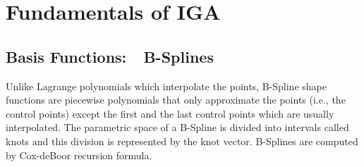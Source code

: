 \documentclass[12pt, a4paper]{report}
\begin{document}
\chapter{Fundamentals of IGA} \label{chap: IGA_Fundamentals}
\section{Basis Functions:~~B-Splines}

Unlike Lagrange polynomials which interpolate the points, B-Spline shape functions are piecewise polynomials that only approximate the points (i.e., the control points) except the first and the last control points which are usually interpolated. The parametric space of a B-Spline is divided into intervals called knots and this division is
represented by the knot vector. B-Splines are computed by Cox-deBoor recursion formula.
\end{document}
